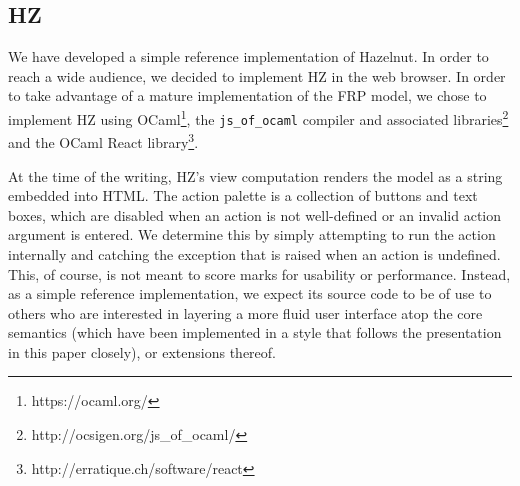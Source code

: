 \subsection{HZ}
We have developed a simple reference implementation of Hazelnut.
In order to reach a wide audience, we decided to implement HZ in the web browser.
In order to take advantage of a mature implementation of the FRP model, we chose to implement HZ using OCaml\footnote{https://ocaml.org/}, the \texttt{js\_of\_ocaml} compiler and associated libraries\footnote{http://ocsigen.org/js\_of\_ocaml/} and the OCaml React library\footnote{http://erratique.ch/software/react}.

At the time of the writing, 
HZ's view computation renders the model as a string embedded into HTML. The action palette is a collection of buttons and text boxes, which are disabled when an action is not well-defined or an invalid action argument is entered. We determine this by simply attempting to run the action internally and catching the exception that is raised when an action is undefined. This, of course, is not meant to score marks for usability or performance. Instead, as a simple reference implementation, we expect its source code to be of use to others who are interested in layering a more fluid user interface atop the core semantics (which have been implemented in a style that follows the presentation in this paper closely), or extensions thereof.
